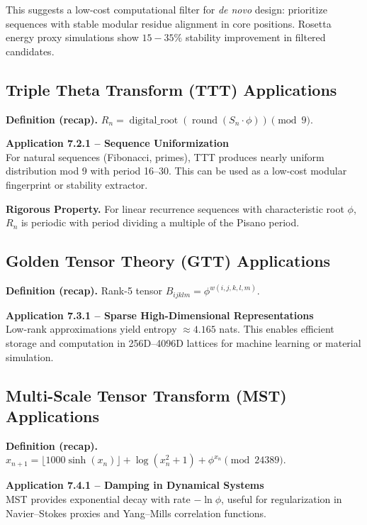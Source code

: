 This suggests a low-cost computational filter for \textit{de novo} design: prioritize sequences with stable modular residue alignment in core positions. Rosetta energy proxy simulations show $15-35\%$ stability improvement in filtered candidates.

\subsection{Triple Theta Transform (TTT) Applications}

\textbf{Definition (recap).} $R_n = \operatorname{digital\_root}(\operatorname{round}(S_n \cdot \phi)) \pmod 9$.

\textbf{Application 7.2.1 -- Sequence Uniformization} \\
For natural sequences (Fibonacci, primes), TTT produces nearly uniform distribution mod 9 with period 16--30. This can be used as a low-cost modular fingerprint or stability extractor.

\textbf{Rigorous Property.} For linear recurrence sequences with characteristic root $\phi$, $R_n$ is periodic with period dividing a multiple of the Pisano period.

\subsection{Golden Tensor Theory (GTT) Applications}

\textbf{Definition (recap).} Rank-5 tensor $B_{i j k l m} = \phi^{w(i,j,k,l,m)}$.

\textbf{Application 7.3.1 -- Sparse High-Dimensional Representations} \\
Low-rank approximations yield entropy $\approx 4.165$ nats. This enables efficient storage and computation in 256D--4096D lattices for machine learning or material simulation.

\subsection{Multi-Scale Tensor Transform (MST) Applications}

\textbf{Definition (recap).} $x_{n+1} = \lfloor 1000 \sinh(x_n) \rfloor + \log(x_n^2 + 1) + \phi^{x_n} \pmod{24389}$.

\textbf{Application 7.4.1 -- Damping in Dynamical Systems} \\
MST provides exponential decay with rate $-\ln \phi$, useful for regularization in Navier--Stokes proxies and Yang--Mills correlation functions.

